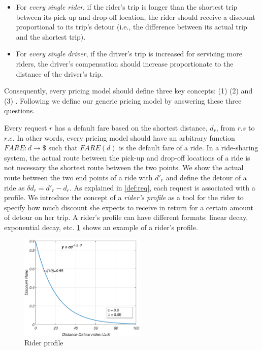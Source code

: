 \begin{itemize}
\item For \textit{every single rider}, if the rider's trip is longer than the shortest trip between its pick-up and drop-off location, the rider should receive a discount proportional to its trip's detour (i.e., the difference between its actual trip and the shortest trip).
\item For \textit{every single driver}, if the driver's trip is increased for servicing more riders, the driver's compensation should increase proportionate to the distance of the driver's trip.
\end{itemize}

Consequently, every pricing model should define three key concepts: (1)  (2)  and (3) . Following we define our generic pricing model by answering these three questions.

Every request $r$ has a default fare based on the shortest distance, $d_r$, from $r.s$ to $r.e$. In other words, every pricing model should have an arbitrary function $FARE: d \rightarrow \$ $ such that $FARE(d)$ is the default fare of a ride. In a ride-sharing system, the actual route between the pick-up and drop-off locations of a ride is not necessary the shortest route between the two points. We show the actual route between the two end points of a ride with $d'_r$ and define the detour of a ride as $\delta d_r = d'_r - d_r$. As explained in \cref{def:req}, each request is associated with a profile. We introduce the concept of a \textit{rider's profile} as a tool for the rider to specify how much discount she expects to receive in return for a certain amount of detour on her trip. A rider's profile can have different formats: linear decay, exponential decay, etc. \cref{fig:rider_profile} shows an example of a rider's profile.

\begin{figure}[!ht]
	\centering
	\includegraphics[width = 60mm]{fig/rider.eps}
	\vspace{-0mm}\caption{Rider profile} \vspace{-2mm} \label{fig:rider_profile}
\end{figure}\vspace{-0mm}

